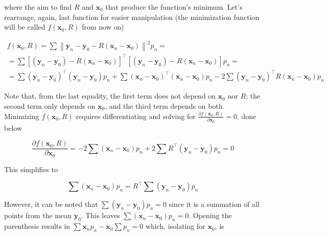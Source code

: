 \documentclass[../main.tex]{subfiles}
\begin{document}
where the aim to find $R$ and $\boldsymbol{x}_{0}$ that produce the function's minimum. Let's rearrange, again, last function for easier manipulation (the minimization function will be called $f(\boldsymbol{x}_{0}, R)$ from now on)

\begin{gather} %
    f(\boldsymbol{x}_{0}, R) = \sum\left\|\boldsymbol{y}_{n}-\boldsymbol{y}_{0}-R\left(\boldsymbol{x}_{n}-\boldsymbol{x}_{0}\right)\right\|^{2} p_{n} = \nonumber \\
    = \sum\left[\left(\boldsymbol{y}_{n}-\boldsymbol{y}_{0}\right)-R\left(\boldsymbol{x}_{n}-\boldsymbol{x}_{0}\right)\right]^{\top} \left[\left(\boldsymbol{y}_{n}-\boldsymbol{y}_{0}\right)-R\left(\boldsymbol{x}_{n}-\boldsymbol{x}_{0}\right)\right] p_{n} = \nonumber \\
    = \sum\left(\boldsymbol{y}_{n}-\boldsymbol{y}_{0}\right)^{\top}\left(\boldsymbol{y}_{n}-\boldsymbol{y}_{0}\right) p_{n}+\sum\left(\boldsymbol{x}_{n}-\boldsymbol{x}_{0}\right)^{\top}\left(\boldsymbol{x}_{n}-\boldsymbol{x}_{0}\right) p_{n}-2 \sum\left(\boldsymbol{y}_{n}-\boldsymbol{y}_{0}\right)^{\top} R\left(\boldsymbol{x}_{n}-\boldsymbol{x}_{0}\right) p_{n} \label{eq:reg_minfun_4_separated}
\end{gather}

Note that, from the last equality, the first term does not depend on $\boldsymbol{x}_{0}$ nor $R$; the second term only depends on $\boldsymbol{x}_{0}$, and the third term depends on both. Minimizing $f(\boldsymbol{x}_{0}, R)$ requires differentiating and solving for $\frac{\partial f(\boldsymbol{x}_{0}, R)}{\partial \boldsymbol{x}_{0}}=0$, done below

\begin{equation}
    \frac{\partial f(\boldsymbol{x}_{0}, R)}{\partial \boldsymbol{x}_{0}}=-2 \sum\left(\boldsymbol{x}_{n}-\boldsymbol{x}_{0}\right) p_{n}+2 \sum R^{\top}\left(\boldsymbol{y}_{n}-\boldsymbol{y}_{0}\right) p_{n}=0
\end{equation}

This simplifies to 

\begin{equation}
    \sum\left(\boldsymbol{x}_{n}-\boldsymbol{x}_{0}\right) p_{n}=R^{\top} \sum\left(\boldsymbol{y}_{n}-\boldsymbol{y}_{0}\right) p_{n}
\end{equation}

However, it can be noted that $\sum\left(\boldsymbol{y}_{n}-\boldsymbol{y}_{0}\right) p_{n}=0$ since it is a summation of all points from the mean $\boldsymbol{y}_{0}$. This leaves $\sum\left(\boldsymbol{x}_{n}-\boldsymbol{x}_{0}\right) p_{n}=0$. Opening the parenthesis results in $\sum\boldsymbol{x}_{n}p_{n}-\boldsymbol{x}_{0}\sum p_{n}=0$ which, isolating for $\boldsymbol{x}_{0}$, is
\end{document}
